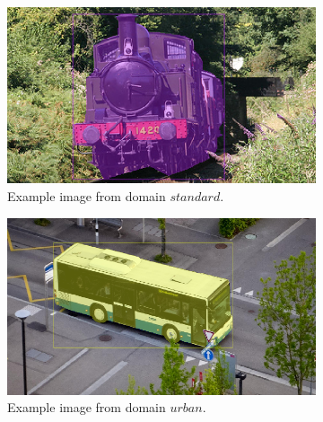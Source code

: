 \begin{figure} 
	\centering
	\begin{subfigure}[t]{0.45\textwidth}
		\centering
		\includegraphics[width=\textwidth]{figures/chap44_standard.png}
		\caption{
			Example image from domain $ standard $.
		} \label{fig:ch4:sec4:domain_standard2}
	\end{subfigure}
	\hfill	
	\begin{subfigure}[t]{0.45\textwidth}
		\centering
		\includegraphics[width=\textwidth]{figures/chap44_urban.png}
		\caption{
			Example image from domain $ urban $.
		} \label{fig:ch4:sec4:domain_industrial}
	\end{subfigure}
	\\
	\begin{subfigure}[t]{0.45\textwidth}
		\centering

\end{subfigure}
\end{figure}
